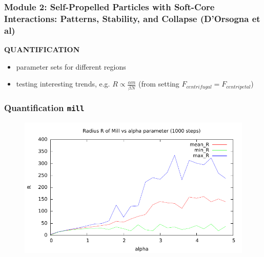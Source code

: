 \documentclass[compress]{beamer}
\begin{document}
\begin{frame}
  \frametitle{Module 2: Self-Propelled Particles with Soft-Core Interactions: Patterns, Stability, and Collapse (D'Orsogna et al)}
	
	\textbf{QUANTIFICATION}
	
\begin{itemize}
	\item parameter sets for different regions
	\item testing interesting trends, e.g. \( R \propto \frac{\alpha m}{\beta N}\) (from setting \( F_{centrifugal} = F_{centripetal} \))

	
\end{itemize}
	
\end{frame}
\begin{frame}
	\frametitle{Quantification \texttt{mill}}
\begin{figure}[H]
	\includegraphics[width=1. \columnwidth]{../plots/mill_II_radius_alpha_1000.pdf}
\end{figure}
\end{frame}
\end{document}
